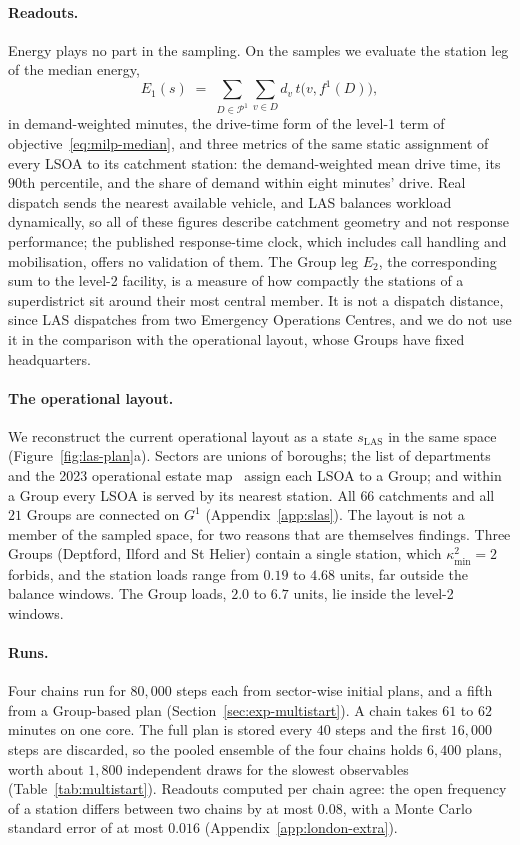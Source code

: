 \documentclass[11pt]{article}
\theoremstyle{definition}
\newcommand{\Pc}{\mathcal{P}}          %
\begin{document}
\paragraph{Readouts.}
Energy plays no part in the sampling. On the samples we evaluate the station leg of the median energy,
\[
  E_1(s) \;=\; \sum_{D \in \Pc^1} \sum_{v \in D} d_v \, t\bigl(v, f^1(D)\bigr),
\]
in demand-weighted minutes, the drive-time form of the level-1 term of objective~\eqref{eq:milp-median}, and three metrics of the same static assignment of every LSOA to its catchment station: the demand-weighted mean drive time, its $90$th percentile, and the share of demand within eight minutes' drive. Real dispatch sends the nearest available vehicle, and LAS balances workload dynamically, so all of these figures describe catchment geometry and not response performance; the published response-time clock, which includes call handling and mobilisation, offers no validation of them. The Group leg $E_2$, the corresponding sum to the level-2 facility, is a measure of how compactly the stations of a superdistrict sit around their most central member. It is not a dispatch distance, since LAS dispatches from two Emergency Operations Centres, and we do not use it in the comparison with the operational layout, whose Groups have fixed headquarters.

\paragraph{The operational layout.}
We reconstruct the current operational layout as a state $s_{\mathrm{LAS}}$ in the same space (Figure~\ref{fig:las-plan}a). Sectors are unions of boroughs; the list of departments~\citep{las_departments2025} and the 2023 operational estate map~\citep{las_estate2023} assign each LSOA to a Group; and within a Group every LSOA is served by its nearest station. All $66$ catchments and all $21$ Groups are connected on $G^1$ (Appendix~\ref{app:slas}). The layout is not a member of the sampled space, for two reasons that are themselves findings. Three Groups (Deptford, Ilford and St Helier) contain a single station, which $\kappa^2_{\min} = 2$ forbids, and the station loads range from $0.19$ to $4.68$ units, far outside the balance windows. The Group loads, $2.0$ to $6.7$ units, lie inside the level-2 windows.

\paragraph{Runs.}\label{sec:las-protocol}
Four chains run for $80{,}000$ steps each from sector-wise initial plans, and a fifth from a Group-based plan (Section~\ref{sec:exp-multistart}). A chain takes $61$ to $62$ minutes on one core. The full plan is stored every $40$ steps and the first $16{,}000$ steps are discarded, so the pooled ensemble of the four chains holds $6{,}400$ plans, worth about $1{,}800$ independent draws for the slowest observables (Table~\ref{tab:multistart}). Readouts computed per chain agree: the open frequency of a station differs between two chains by at most $0.08$, with a Monte Carlo standard error of at most $0.016$ (Appendix~\ref{app:london-extra}).
\end{document}
